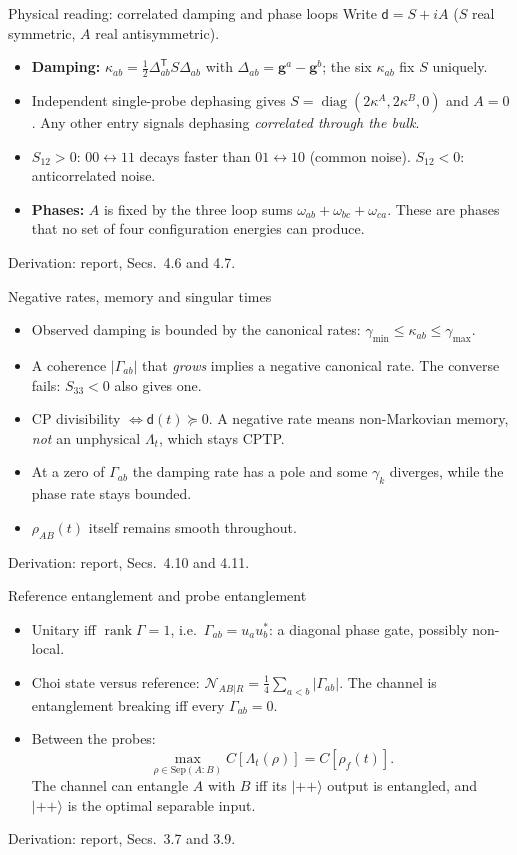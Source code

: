 \documentclass[aspectratio=169,11pt]{beamer}
\newcommand{\ket}[1]{\lvert #1\rangle}
\newcommand{\diag}{\operatorname{diag}}
\newcommand{\rank}{\operatorname{rank}}
\newcommand{\dmat}{\mathsf d}
\newcommand{\report}[1]{{\color{muted}\footnotesize Derivation: report, #1.}}
\begin{document}
\begin{frame}{Physical reading: correlated damping and phase loops}
Write $\dmat=S+iA$ ($S$ real symmetric, $A$ real antisymmetric).
\begin{itemize}\setlength\itemsep{6pt}
\item \textbf{Damping:} $\kappa_{ab}=\tfrac12\Delta_{ab}^{\mathsf T}S\Delta_{ab}$
with $\Delta_{ab}=\mathbf g^a-\mathbf g^b$; the six $\kappa_{ab}$ fix $S$
uniquely.
\item Independent single-probe dephasing gives $S=\diag(2\kappa^A,2\kappa^B,0)$
and $A=0$. Any other entry signals dephasing \emph{correlated through the bulk}.
\item $S_{12}>0$: $00\leftrightarrow11$ decays faster than
$01\leftrightarrow10$ (common noise). $S_{12}<0$: anticorrelated noise.
\item \textbf{Phases:} $A$ is fixed by the three loop sums
$\omega_{ab}+\omega_{bc}+\omega_{ca}$. These are phases that no set of four
configuration energies can produce.
\end{itemize}
\report{Secs.~4.6 and 4.7}
\end{frame}

\begin{frame}{Negative rates, memory and singular times}
\begin{itemize}\setlength\itemsep{7pt}
\item Observed damping is bounded by the canonical rates:
$\gamma_{\min}\le\kappa_{ab}\le\gamma_{\max}$.
\item A coherence $|\Gamma_{ab}|$ that \emph{grows} implies a negative
canonical rate. The converse fails: $S_{33}<0$ also gives one.
\item CP divisibility $\iff\dmat(t)\succeq0$. A negative rate means
non-Markovian memory, \emph{not} an unphysical $\Lambda_t$, which stays CPTP.
\item At a zero of $\Gamma_{ab}$ the damping rate has a pole and some
$\gamma_k$ diverges, while the phase rate stays bounded.
\item $\rho_{AB}(t)$ itself remains smooth throughout.
\end{itemize}
\report{Secs.~4.10 and 4.11}
\end{frame}

\begin{frame}{Reference entanglement and probe entanglement}
\begin{itemize}\setlength\itemsep{7pt}
\item Unitary iff $\rank\Gamma=1$, i.e.\ $\Gamma_{ab}=u_au_b^*$: a diagonal
phase gate, possibly non-local.
\item Choi state versus reference:
$\mathcal N_{AB|R}=\tfrac14\sum_{a<b}|\Gamma_{ab}|$. The channel is
entanglement breaking iff every $\Gamma_{ab}=0$.
\item Between the probes:
\[
\boxed{\max_{\rho\in\mathrm{Sep}(A:B)}C[\Lambda_t(\rho)]=C[\rho_f(t)].}
\]
The channel can entangle $A$ with $B$ iff its $\ket{++}$ output is entangled,
and $\ket{++}$ is the optimal separable input.
\end{itemize}
\report{Secs.~3.7 and 3.9}
\end{frame}
\end{document}

